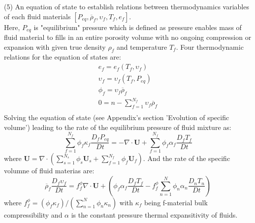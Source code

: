 \documentclass[preprint,12pt]{elsarticle}
\begin{document}
(5) An equation of state to establish relations between thermodynamics variables of each fluid materials $[P_{eq}, \overline{\rho}_f, \upsilon_f, T_f, e_f]$. \\
Here, $P_{eq}$ is "equilibrium" pressure which is defined as pressure enables mass of fluid material to fills in an entire porosity volume with no ongoing compression or expansion with given true density $\rho_f$ and temperature $T_f$.  Four thermodynamic relations for the equation of states are:
%
%
\begin{equation}
\begin{gathered}
  e_f =  e_f (T_f, \upsilon_f)\\
 \upsilon_f =  \upsilon_f (T_f, P_{eq})\\
  \phi_f = \upsilon_f \overline{\rho}_f\\
  0 = n - \sum_{f=1}^{N_f} \upsilon_f \overline{\rho}_f\\
\end{gathered}
\end{equation}
%
%
Solving the equation of state (see Appendix's section 'Evolution of specific volume') leading to the rate of the equilibrium pressure of fluid mixture as:
%
%
\begin{equation}
\sum_{f=1}^{N_f} \phi_f \kappa_f \frac{D_f P_{eq}}{Dt} = - \nabla \cdot \pmb{U} + \sum_{f=1}^{N_f} \phi_f \alpha_f \frac{D_f T_f}{Dt}
\end{equation}
%
%
where $\pmb{U} = \nabla \cdot (\sum_{s=1}^{N_s} \phi_s \pmb{U}_s + \sum_{f=1}^{N_f}  \phi_f \pmb{U}_f)$.
And the rate of the specific volumne of fluid materias are:
%
%
\begin{equation}
\label{specific volume}
\overline{\rho}_f \frac{D_f \upsilon_f }{Dt} = f_f^{\phi} \nabla \cdot \pmb{U} + (\phi_f \alpha_f \frac{D_f T_f}{Dt} - f_f^{\phi} \sum_{n=1}^{N} \phi_n \alpha_n \frac{D_n T_n}{Dt})
\end{equation}
where $ f_f^{\phi} = (\phi_f  \kappa_f ) / (\sum_{n=1}^{N} \phi_n \kappa_n)$ with  $\kappa_f$ being f-material bulk compressibility and $\alpha$ is the constant pressure thermal expansitivity of fluids.
%
%
\end{document}
